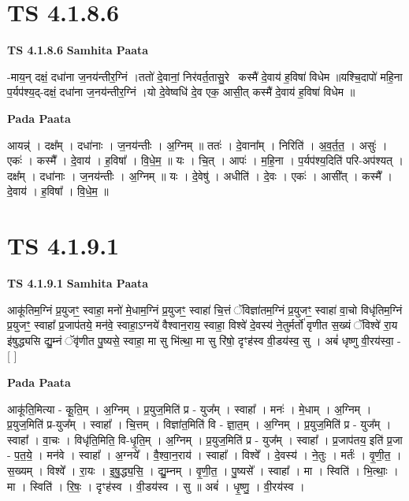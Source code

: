\documentclass[17pt]{extarticle}
\begin{document}
\section*{ TS 4.1.8.6 }

\textbf{TS 4.1.8.6 } \newline
\textbf{Samhita Paata} \newline

-माय॒न् दक्षं॒ दधा॑ना ज॒नय॑न्तीर॒ग्निं ।ततो॑ दे॒वानां॒ निर॑वर्त॒तासु॒रेकः᳡कस्मै॑ दे॒वाय॑ ह॒विषा॑ विधेम ॥यश्चि॒दापो॑ महि॒ना प॒र्यप॑श्य॒द्-दक्षं॒ दधा॑ना ज॒नय॑न्तीर॒ग्निं ।यो दे॒वेष्वधि॑ दे॒व एक॒ आसी॒त् कस्मै॑ दे॒वाय॑ ह॒विषा॑ विधेम ॥ \newline

\textbf{Pada Paata} \newline

आयन्न्॑ । दक्ष᳚म् । दधा॑नाः । ज॒नय॑न्तीः । अ॒ग्निम् ॥ ततः॑ । दे॒वाना᳚म् । निरिति॑ । अ॒व॒र्त॒त॒ । असुः॑ । एकः॑ । कस्मै᳚ । दे॒वाय॑ । ह॒विषा᳚ । वि॒धे॒म॒ ॥ यः । चि॒त् । आपः॑ । म॒हि॒ना । प॒र्यप॑श्य॒दिति॑ परि-अप॑श्यत् । दक्ष᳚म् । दधा॑नाः । ज॒नय॑न्तीः । अ॒ग्निम् ॥ यः । दे॒वेषु॑ । अधीति॑ । दे॒वः । एकः॑ । आसी᳚त् । कस्मै᳚ । दे॒वाय॑ । ह॒विषा᳚ । वि॒धे॒म॒ ॥  \newline




\section*{ TS 4.1.9.1 }

\textbf{TS 4.1.9.1 } \newline
\textbf{Samhita Paata} \newline

आकू॑तिम॒ग्निं प्र॒युजꣳ॒॒ स्वाहा॒ मनो॑ मे॒धाम॒ग्निं प्र॒युजꣳ॒॒ स्वाहा॑ चि॒त्तं ॅविज्ञा॑तम॒ग्निं प्र॒युजꣳ॒॒ स्वाहा॑ वा॒चो विधृ॑तिम॒ग्निं प्र॒युजꣳ॒॒ स्वाहा᳚ प्र॒जाप॑तये॒ मन॑वे॒ स्वाहा॒ऽग्नये॑ वैश्वान॒राय॒ स्वाहा॒ विश्वे॑ दे॒वस्य॑ ने॒तुर्मर्तो॑ वृणीत स॒ख्यं ॅविश्वे॑ रा॒य इ॑षुद्ध्यसि द्यु॒म्नं ॅवृ॑णीत पु॒ष्यसे॒ स्वाहा॒ मा सु भि॑त्था॒ मा सु रि॑षो॒ दृꣳह॑स्व वी॒डय॑स्व॒ सु । अबं॑ धृष्णु वी॒रय॑स्वा॒ - [  ] \newline

\textbf{Pada Paata} \newline

आकू॑ति॒मित्या - कू॒ति॒म् । अ॒ग्निम् । प्र॒युज॒मिति॑ प्र - युज᳚म् । स्वाहा᳚ । मनः॑ । मे॒धाम् । अ॒ग्निम् । प्र॒युज॒मिति॑ प्र-युज᳚म् । स्वाहा᳚ । चि॒त्तम् । विज्ञा॑त॒मिति॑ वि - ज्ञा॒त॒म् । अ॒ग्निम् । प्र॒युज॒मिति॑ प्र - युज᳚म् । स्वाहा᳚ । वा॒चः । विधृ॑ति॒मिति॒ वि-धृ॒ति॒म् । अ॒ग्निम् । प्र॒युज॒मिति॑ प्र - युज᳚म् । स्वाहा᳚ । प्र॒जाप॑तय॒ इति॑ प्र॒जा - प॒त॒ये॒ । मन॑वे । स्वाहा᳚ । अ॒ग्नये᳚ । वै॒श्वा॒न॒राय॑ । स्वाहा᳚ । विश्वे᳚ । दे॒वस्य॑ । ने॒तुः । मर्तः॑ । वृ॒णी॒त॒ । स॒ख्यम् । विश्वे᳚ । रा॒यः । इ॒षु॒द्ध्य॒सि॒ । द्यु॒म्नम् । वृ॒णी॒त॒ । पु॒ष्यसे᳚ । स्वाहा᳚ । मा । स्विति॑ । भि॒त्थाः॒ । मा । स्विति॑ । रि॒षः॒ । दृꣳह॑स्व । वी॒डय॑स्व । सु ॥ अबं॑ । धृ॒ष्णु॒ । वी॒रय॑स्व ।  \newline
\end{document}
